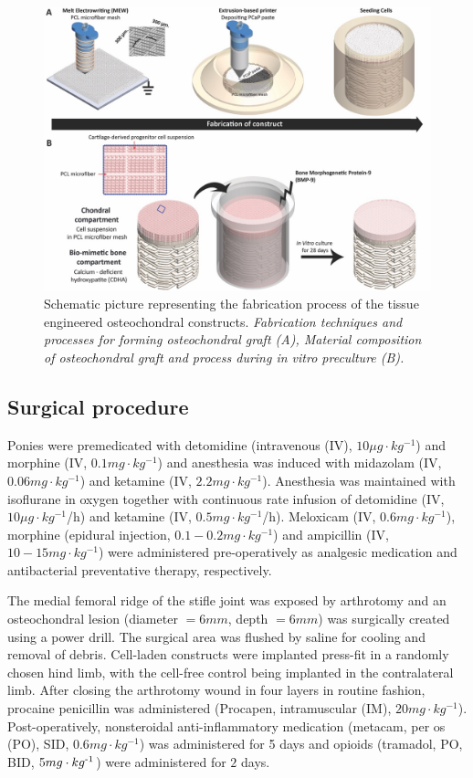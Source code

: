 \documentclass[twocolumn, serif, empirical, authordate, seplic]{jote-article}
\begin{document}
\begin{figure}
\centering \includegraphics[width=.8\textwidth]{articles/empirical/horse/media/image2.jpg}
\caption{Schematic picture representing the fabrication process of the tissue engineered osteochondral constructs. \emph{Fabrication techniques and processes for forming osteochondral graft (A), Material composition of osteochondral graft and process during in vitro preculture (B).}}
\label{fig:figure2}\end{figure}



 {}\subsection*{Surgical procedure} 

Ponies were premedicated with detomidine (intravenous (IV), $ 10 \mu g\cdot kg^{-1} $) and morphine (IV,  $0.1 mg\cdot kg^{-1} $) and anesthesia was induced with midazolam (IV, $ 0.06 mg\cdot kg^{-1} $) and ketamine (IV, $ 2.2 mg\cdot kg^{-1} $). Anesthesia was maintained with isoflurane in oxygen together with continuous rate infusion of detomidine (IV, $ 10 \mu g\cdot kg^{-1} $/h) and ketamine (IV, $ 0.5 mg\cdot kg^{-1} $/h). Meloxicam (IV, $ 0.6 mg\cdot kg^{-1} $), morphine (epidural injection, $0.1 - 0.2 mg\cdot kg^{-1} $) and ampicillin (IV, $10 - 15 mg\cdot kg^{-1} $) were administered pre-operatively as analgesic medication and antibacterial preventative therapy, respectively.

The medial femoral ridge of the stifle joint was exposed by arthrotomy and an osteochondral lesion (diameter $= 6 mm$, depth $= 6 mm$) was surgically created using a power drill. The surgical area was flushed by saline for cooling and removal of debris. Cell-laden constructs were implanted press-fit in a randomly chosen hind limb, with the cell-free control being implanted in the contralateral limb. After closing the arthrotomy wound in four layers in routine fashion, procaine penicillin was administered (Procapen, intramuscular (IM), $ 20 mg\cdot kg^{-1} $). Post-operatively, nonsteroidal anti-inflammatory medication (metacam, per os (PO), SID, $ 0.6 mg\cdot kg^{-1} $) was administered for 5 days and opioids (tramadol, PO, BID, $5 mg\cdot kg\textsuperscript{-1}$) were administered for $2$ days.
\end{document}
